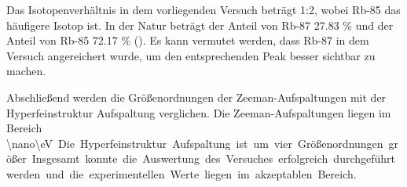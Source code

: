 Das Isotopenverhältnis in dem vorliegenden Versuch beträgt 1:2, wobei Rb-85 das häufigere Isotop ist.
In der Natur beträgt der Anteil von Rb-87 27.83 \% und der Anteil von Rb-85 72.17 \% (\cite{rubidium}).
Es kann vermutet werden, dass Rb-87 in dem Versuch angereichert wurde, um den entsprechenden Peak besser sichtbar zu machen.

Abschließend werden die Größenordnungen der Zeeman-Aufspaltungen mit der Hyperfeinstruktur Aufspaltung verglichen.
Die Zeeman-Aufspaltungen liegen im Bereich \qty{\nano\eV}.
Die Hyperfeinstruktur Aufspaltung ist um vier Größenordnungen größer.

Insgesamt konnte die Auswertung des Versuches erfolgreich durchgeführt werden und die experimentellen Werte liegen im akzeptablen Bereich.
